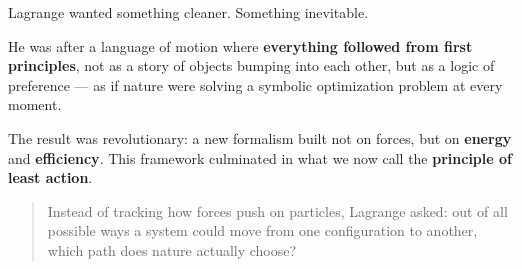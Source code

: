 Lagrange wanted something cleaner. Something inevitable.

He was after a language of motion where \textbf{everything followed from first principles}, not as a story of objects bumping into each other, but as a logic of preference — as if nature were solving a symbolic optimization problem at every moment.

The result was revolutionary: a new formalism built not on forces, but on \textbf{energy} and \textbf{efficiency}. This framework culminated in what we now call the \textbf{principle of least action}.

\begin{quote}
    Instead of tracking how forces push on particles, Lagrange asked: out of all possible ways a system could move from one configuration to another, which path does nature actually choose?
\end{quote}


